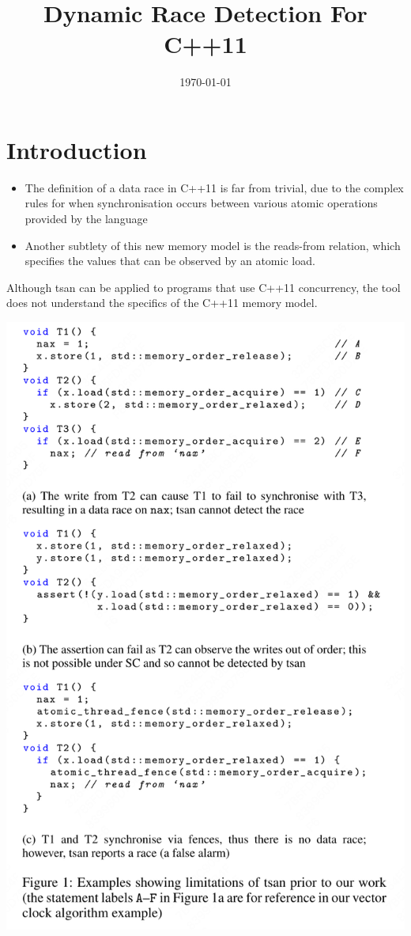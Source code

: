\documentclass[11pt]{article}
\date{\today}
\title{Dynamic Race Detection For C++11}
\begin{document}
\maketitle
\section{Introduction}
\label{sec:orgaa74f2c}
\begin{itemize}
\item The definition of a data race in C++11 is far from trivial, due to the complex rules for when
synchronisation occurs between various atomic operations provided by the language
\item Another subtlety of this new memory model is the reads-from relation, which specifies the values
that can be observed by an atomic load.
\end{itemize}

Although tsan can be applied to programs that use C++11 concurrency, the tool does not understand the
specifics of the C++11 memory model.

\begin{center}
\includegraphics[width=.7\textwidth]{../../images/papers/126.png}
\label{1}
\end{center}
\end{document}
